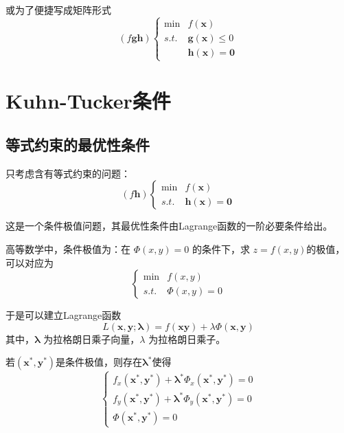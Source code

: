 \documentclass{book}
\begin{document}
或为了便捷写成矩阵形式
\begin{equation*}
    (f\boldsymbol{gh})\begin{cases}
        \min & f(\boldsymbol{x})                             \\
        s.t. & \boldsymbol{g}(\boldsymbol{x})\le0            \\
             & \boldsymbol{h}(\boldsymbol{x})=\boldsymbol{0}
    \end{cases}
\end{equation*}

\section{Kuhn-Tucker条件}

\subsection{等式约束的最优性条件}

只考虑含有等式约束的问题：
\begin{equation}
    (f\boldsymbol{h})\begin{cases}
        \min & f(\boldsymbol{x})                             \\
        s.t. & \boldsymbol{h}(\boldsymbol{x})=\boldsymbol{0}
    \end{cases}
    \label{equ:constrained optimization problem with equality constraints}
\end{equation}

这是一个条件极值问题，其最优性条件由Lagrange函数的一阶必要条件给出。

高等数学中，条件极值为：在 $\Phi(x,y)=0$ 的条件下，求 $z=f(x,y)$的极值，可以对应为
$$
    \begin{cases}
        \min & f(x,y)      \\
        s.t. & \Phi(x,y)=0
    \end{cases}
$$

于是可以建立Lagrange函数
\begin{equation}
    L(\boldsymbol{x},\boldsymbol{y};\boldsymbol{\lambda})=f(\boldsymbol{x}\boldsymbol{y})+\lambda\Phi(\boldsymbol{x},\boldsymbol{y})
\end{equation}
其中，$\boldsymbol{\lambda}$ 为拉格朗日乘子向量，$\lambda$ 为拉格朗日乘子。

若$(\boldsymbol{x}^*,\boldsymbol{y}^*)$是条件极值，则存在$\boldsymbol{\lambda}^*$使得
$$\begin{cases}
        f_x(\boldsymbol{x}^*,\boldsymbol{y}^*)+\boldsymbol{\lambda}^*\Phi_x(\boldsymbol{x}^*,\boldsymbol{y}^*)=0 \\
        f_y(\boldsymbol{x}^*,\boldsymbol{y}^*)+\boldsymbol{\lambda}^*\Phi_y(\boldsymbol{x}^*,\boldsymbol{y}^*)=0 \\
        \Phi(\boldsymbol{x}^*,\boldsymbol{y}^*)=0
    \end{cases}$$
\end{document}
